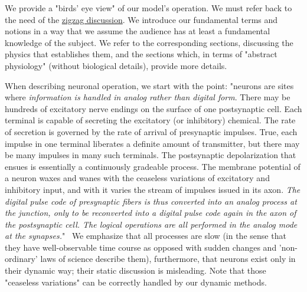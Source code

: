 We provide a "birds' eye view" of our model's operation.
We must refer back to the need of the \hyperlink{zigzagdiscussion}{zigzag discussion}.
We introduce our fundamental 
terms and notions in a way that we assume the audience has at least a fundamental 
knowledge of the subject. We refer to the corresponding 
sections, discussing the physics that establishes them, and the sections which,
in terms of "abstract physiology" (without biological details), provide more details.

When describing neuronal operation, we start with the point:
"neurons are sites where \textit{information is handled in analog rather than digital form}.
There may be hundreds of excitatory nerve endings on the surface of one
postsynaptic cell. Each terminal is capable of secreting the excitatory (or
inhibitory) chemical. The rate of secretion is governed by the rate of arrival of
presynaptic impulses. True, each impulse in one terminal liberates a definite
amount of transmitter, but there may be many impulses in
many such terminals. The postsynaptic depolarization that ensues is essentially a
continuously gradeable process. The membrane potential of a neuron waxes and
wanes with the ceaseless variations of excitatory and inhibitory input, and with
it varies the stream of impulses issued in its axon. \textit{The digital pulse code of
presynaptic fibers is thus converted into an analog process at the junction, only
to be reconverted into a digital pulse code again in the axon of the postsynaptic
cell. The logical operations are all performed in the analog mode at the synapses.}"~\cite{SomjenBook:1972}
We emphasize that all processes are slow (in the sense that they have well-observable time course as opposed with sudden changes and 'non-ordinary' laws of science describe them),
furthermore, that neurons exist only in their dynamic way; their static discussion is misleading.
Note that those "ceaseless variations" can be correctly handled by our dynamic methods.


